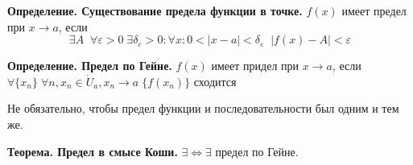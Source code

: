 \documentclass[12pt, paper]{article}
\newcommand{\eps}{\varepsilon}
\begin{document}
\begin{tcolorbox}
	\textbf{Определение. Существование предела функции в точке.} $f(x)$ имеет предел при $x \to a$, если 
	\[ \exists A\;\; \forall \eps > 0\; \exists \delta_\eps > 0: \forall x: 0<|x-a| < \delta_\eps\;\; |f(x) - A| < \eps  \]
\end{tcolorbox}

\begin{tcolorbox}
	\textbf{Определение. Предел по Гейне. } $f(x)$ имеет придел при $x \to a$, если\\
	$\forall \{x_n\}\; \forall n, x_n \in \mathring U_a, x_n \to a\; \{f(x_n)\}$ сходится
\end{tcolorbox}
Не обязательно, чтобы предел функции и последовательности был одним и тем же.

\begin{tcolorbox}
	\textbf{Теорема. Предел в смысе Коши.}
	$\exists \Leftrightarrow \exists$ предел по Гейне.
\end{tcolorbox}
\end{document}
